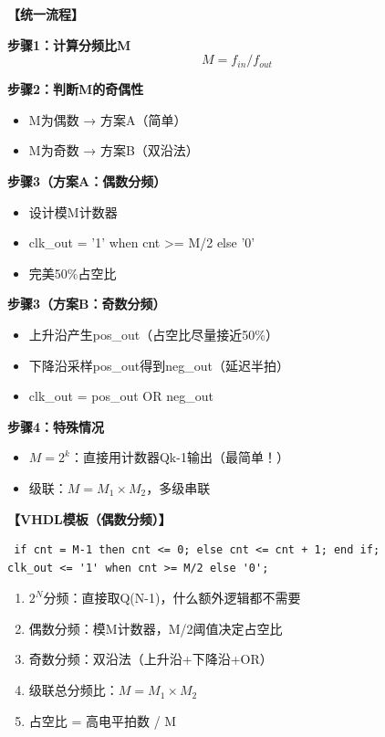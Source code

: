 \begin{solution}[完整解答]

\textbf{【统一流程】}

\textbf{步骤1：计算分频比M}
$$M = f_{in} / f_{out}$$

\textbf{步骤2：判断M的奇偶性}
\begin{itemize}
  \item M为偶数 → 方案A（简单）
  \item M为奇数 → 方案B（双沿法）
\end{itemize}

\textbf{步骤3（方案A：偶数分频）}
\begin{itemize}
  \item 设计模M计数器
  \item clk\_out = '1' when cnt >= M/2 else '0'
  \item 完美50\%占空比
\end{itemize}

\textbf{步骤3（方案B：奇数分频）}
\begin{itemize}
  \item 上升沿产生pos\_out（占空比尽量接近50\%）
  \item 下降沿采样pos\_out得到neg\_out（延迟半拍）
  \item clk\_out = pos\_out OR neg\_out
\end{itemize}

\textbf{步骤4：特殊情况}
\begin{itemize}
  \item $M=2^k$：直接用计数器Qk-1输出（最简单！）
  \item 级联：$M=M_1\times M_2$，多级串联
\end{itemize}

\textbf{【VHDL模板（偶数分频）】}
\begin{lstlisting}
 if cnt = M-1 then cnt <= 0; else cnt <= cnt + 1; end if;
clk_out <= '1' when cnt >= M/2 else '0';
\end{lstlisting}

\end{solution}

\begin{quickkill}[分频器秒杀总结]
\begin{enumerate}
  \item $2^N$分频：直接取Q(N-1)，什么额外逻辑都不需要
  \item 偶数分频：模M计数器，M/2阈值决定占空比
  \item 奇数分频：双沿法（上升沿+下降沿+OR）
  \item 级联总分频比：$M=M_1\times M_2$
  \item 占空比 = 高电平拍数 / M
\end{enumerate}
\end{quickkill}
